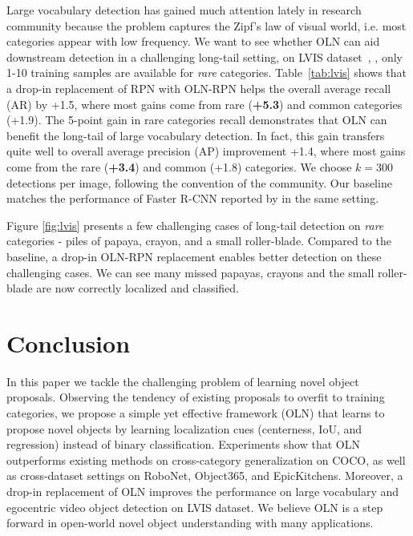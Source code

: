 \documentclass[10pt,twocolumn,letterpaper]{article}
\newcommand{\OURS}{OLN}
\newcommand{\tableref}[1]{Table~\ref{#1}}
\begin{document}
Large vocabulary detection has gained much attention lately in research community \cite{gupta2019lvis,wang2020devil,ghiasi2020simple,tan20201st} because the problem captures the Zipf's law of visual world, i.e. most categories appear with low frequency. We want to see whether \OURS{} can aid downstream detection in a challenging long-tail setting, on LVIS dataset~\cite{gupta2019lvis}, \eg, only 1-10 training samples are available for \textit{rare} categories. \tableref{tab:lvis} shows that a drop-in replacement of RPN\cite{fasterNIPS2015} with \OURS{}-RPN helps the overall average recall (AR) by +1.5, where most gains come from rare (\textbf{+5.3}) and common categories (+1.9). The 5-point gain in rare categories recall  demonstrates that OLN can benefit the long-tail of large vocabulary detection. In fact, this gain transfers quite well to overall average precision (AP) improvement +1.4, where most gains come from the rare (\textbf{+3.4}) and common (+1.8) categories. We choose $k=300$ detections per image, following the convention of the community. Our baseline matches the performance of Faster R-CNN reported by \cite{wang2020frustratingly} in the same setting. 


Figure \ref{fig:lvis} presents a few challenging cases of long-tail detection on \textit{rare} categories - piles of papaya, crayon, and a small roller-blade. Compared to the baseline, a drop-in OLN-RPN replacement enables better detection on these challenging cases. We can see many missed papayas, crayons and the small roller-blade are now correctly localized and classified.




\section{Conclusion}
In this paper we tackle the challenging problem of learning novel object proposals. Observing the tendency of existing proposals to overfit to training categories, we propose a simple yet effective framework (\OURS{}) that learns to propose novel objects by learning localization cues (centerness, IoU, and regression) instead of binary classification. Experiments show that \OURS{} outperforms existing methods on cross-category generalization on COCO, as well as cross-dataset settings on RoboNet, Object365, and EpicKitchens. Moreover, a drop-in replacement of \OURS{} improves the performance on large vocabulary and egocentric video object detection on LVIS dataset. We believe \OURS{} is a step forward in open-world novel object understanding with many applications.

{\small


}
\end{document}
